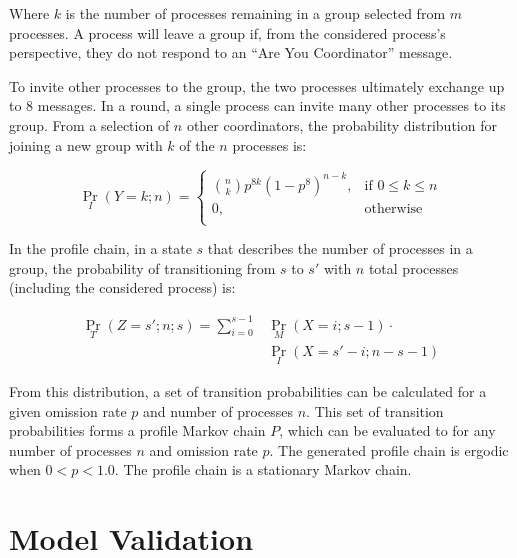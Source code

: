 Where $k$ is the number of processes remaining in a group selected from $m$ processes.
A process will leave a group if, from the considered process's perspective, they do not respond to an ``Are You Coordinator'' message.

To invite other processes to the group, the two processes ultimately exchange up to 8 messages.
In a round, a single process can invite many other processes to its group.
From a selection of $n$ other coordinators, the probability distribution for joining a new group with $k$ of the $n$ processes is:

\begin{equation}
    \Pr_{I}(Y=k; n) =
    \begin{cases}
        \binom{n}{k} p^{8k}(1-p^8)^{n-k}, & \text{if } 0 \leq k \leq n \\
        0,                                & \text{otherwise} \\
    \end{cases}
\end{equation}

In the profile chain, in a state $s$ that describes the number of processes in a group, the probability of transitioning from $s$ to $s'$ with $n$ total processes (including the considered process) is:

\begin{align} \Pr_{T}(Z=s'; n; s) = \sum_{i=0}^{s-1} &\Pr_{M}(X=i; s-1) \cdot
\nonumber \\ &\Pr_{I}(X=s'-i; n-s-1) \end{align}

From this distribution, a set of transition probabilities can be calculated for a given omission rate $p$ and number of processes $n$.
This set of transition probabilities forms a profile Markov chain $P$, which can be evaluated to for any number of processes $n$ and omission rate $p$.
The generated profile chain is ergodic when $0<p<1.0$. The profile chain is a stationary Markov chain.

\section{Model Validation}


